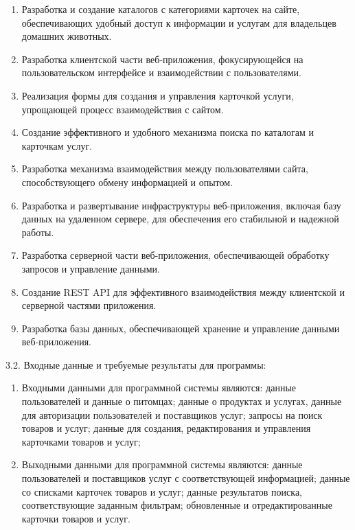 \begin{enumerate}
\item Разработка и создание каталогов с категориями карточек на сайте, обеспечивающих удобный доступ к информации и услугам для владельцев домашних животных.
\item Разработка клиентской части веб-приложения, фокусирующейся на пользовательском интерфейсе и взаимодействии с пользователями.
\item Реализация формы для создания и управления карточкой услуги, упрощающей процесс взаимодействия с сайтом.
\item Создание эффективного и удобного механизма поиска по каталогам и карточкам услуг.
\item Разработка механизма взаимодействия между пользователями сайта, способствующего обмену информацией и опытом.
\item Разработка и развертывание инфраструктуры веб-приложения, включая базу данных на удаленном сервере, для обеспечения его стабильной и надежной работы.
\item Разработка серверной части веб-приложения, обеспечивающей обработку запросов и управление данными.
\item Создание REST API для эффективного взаимодействия между клиентской и серверной частями приложения.
\item Разработка базы данных, обеспечивающей хранение и управление данными веб-приложения.
\end{enumerate}

{\parindent0pt
  3.2. Входные данные и требуемые результаты для программы:}

\begin{enumerate}
\item Входными данными для программной системы являются: данные пользователей и данные о питомцах;
данные о продуктах и услугах, данные для авторизации пользователей и поставщиков услуг;
запросы на поиск товаров и услуг;
данные для создания, редактирования и управления карточками товаров и услуг;
\item Выходными данными для программной системы являются: данные пользователей и поставщиков услуг с соответствующей информацией;
данные со списками карточек товаров и услуг;
данные результатов поиска, соответствующие заданным фильтрам;
обновленные и отредактированные карточки товаров и услуг.
\end{enumerate}

